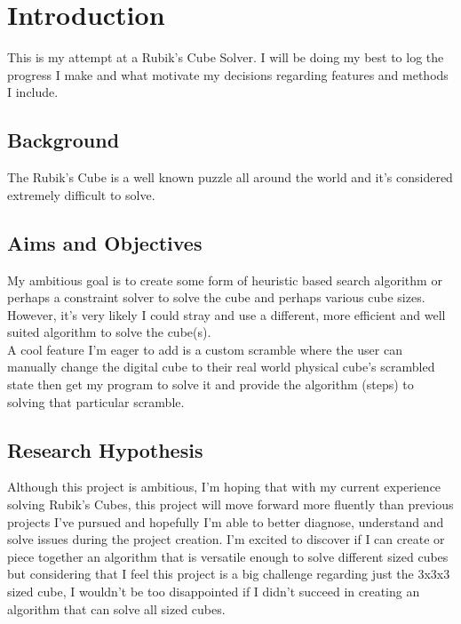 \section{Introduction}
This is my attempt at a Rubik's Cube Solver. I will be doing my best to log the progress I make and what motivate my decisions regarding  features and methods I include.
\subsection{Background}
The Rubik's Cube is a well known puzzle all around the world and it's considered extremely difficult to solve.
\subsection{Aims and Objectives}
My ambitious goal is to create some form of heuristic based search algorithm or perhaps a constraint solver to solve the cube and perhaps various cube sizes. However, it's very likely I could stray and use a different, more efficient and well suited algorithm to solve the cube(s).
\\
A cool feature I'm eager to add is a custom scramble where the user can manually change the digital cube to their real world physical cube's scrambled state then get my program to solve it and provide the algorithm (steps) to solving that particular scramble.
\\


\subsection{Research Hypothesis}
Although this project is ambitious, I'm hoping that with my current experience solving Rubik's Cubes, this project will move forward more fluently than previous projects I've pursued and hopefully I'm able to better diagnose, understand and solve issues during the project creation.
\newline
\newline
I'm excited to discover if I can create or piece together an algorithm that is versatile enough to solve different sized cubes but considering that I feel this project is a big challenge regarding just the 3x3x3 sized cube, I wouldn't be too disappointed if I didn't succeed in creating an algorithm that can solve all sized cubes.
\newpage